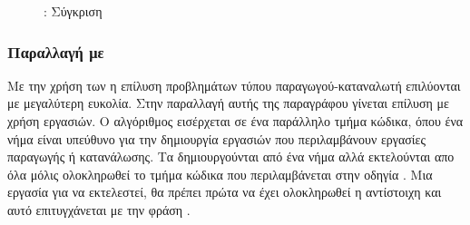 \begin{figure}[h]
\begin{center}
\resizebox{0.4\textwidth}{!} {
}%
\end{center}
\caption{: Σύγκριση }
\end{figure}
\clearpage

\subsubsection{Παραλλαγή με }
Με την χρήση των  η επίλυση προβλημάτων τύπου παραγωγού-καταναλωτή 
επιλύονται με μεγαλύτερη ευκολία. Στην παραλλαγή αυτής της παραγράφου γίνεται επίλυση με χρήση εργασιών. Ο αλγόριθμος εισέρχεται σε ένα παράλληλο τμήμα κώδικα, όπου ένα νήμα είναι υπεύθυνο για την δημιουργία εργασιών που περιλαμβάνουν εργασίες παραγωγής ή κατανάλωσης. Τα  δημιουργούνται από ένα νήμα αλλά εκτελούνται απο όλα μόλις ολοκληρωθεί το τμήμα κώδικα που περιλαμβάνεται στην οδηγία . Μια  εργασία για να εκτελεστεί, θα πρέπει πρώτα να έχει ολοκληρωθεί η αντίστοιχη  και αυτό επιτυγχάνεται με την φράση .

